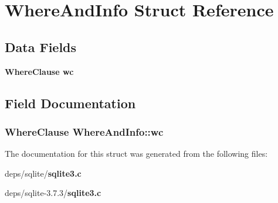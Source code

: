 \section{Where\-And\-Info Struct Reference}
\label{structWhereAndInfo}
\subsection*{Data Fields}
\begin{CompactItemize}
\item 
\bf{Where\-Clause} \bf{wc}
\end{CompactItemize}


\subsection{Field Documentation}
\subsubsection{\setlength{\rightskip}{0pt plus 5cm}\bf{Where\-Clause} \bf{Where\-And\-Info::wc}}\label{structWhereAndInfo_5aab0c382649e62efb572e5d8b39f815}




The documentation for this struct was generated from the following files:\begin{CompactItemize}
\item 
deps/sqlite/\bf{sqlite3.c}\item 
deps/sqlite-3.7.3/\bf{sqlite3.c}\end{CompactItemize}
